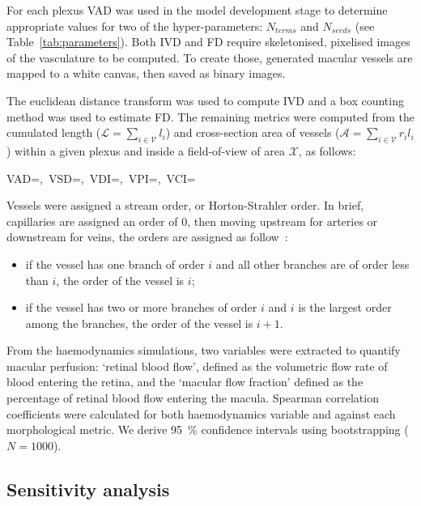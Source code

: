 \documentclass[11pt,]{article}
\let\oldequation\equation
\let\oldendequation\endequation
\renewenvironment{equation}
  {\linenomathNonumbers\oldequation}
  {\oldendequation\endlinenomath}
\begin{document}
For each plexus VAD was used in the model development stage to determine appropriate values for two of the hyper-parameters: $N_{terms}$ and $N_{seeds}$ (see Table~\ref{tab:parameters}).
Both IVD and FD require skeletonised, pixelised images of the vasculature to be computed.
To create those, generated macular vessels are mapped to a white canvas, then saved as binary images.

The euclidean distance transform was used to compute IVD and a box counting method was used to estimate FD. The remaining metrics were computed from the cumulated length ($\mathcal L=\sum_{i\in\mathcal V} l_i$) and cross-section area of vessels ($\mathcal A=\sum_{i\in\mathcal V} r_il_i$) within a given plexus and inside a field-of-view of area $\mathcal X$,  as follows:

\begin{equation}\label{eq:OCTAmetrics}
VAD=,\ VSD=,\ VDI=,\ VPI=,\ VCI=
\end{equation}

Vessels were assigned a stream order, or Horton-Strahler order.
In brief, capillaries are assigned an order of 0, then moving upstream for arteries or downstream for veins, the orders are assigned as follow~\cite{An2020}:
\begin{itemize}
\item if the vessel has one branch of order $i$ and all other branches are of order less than $i$, the order of the vessel is $i$;
\item if the vessel has two or more branches of order $i$ and $i$ is the largest order among the branches, the order of the vessel is $i+1$.
\end{itemize}

From the haemodynamics simulations, two variables were extracted to quantify macular perfusion: `retinal blood flow', defined as the volumetric flow rate of blood entering the retina, and the `macular flow fraction' defined as the percentage of retinal blood flow entering the macula.
Spearman correlation coefficients were calculated for both haemodynamics variable and against each morphological metric.
We derive \SI{95}{\percent} confidence intervals using bootstrapping ($N=1000$).

\subsection{Sensitivity analysis}\label{sec:method-gsa}
\end{document}
